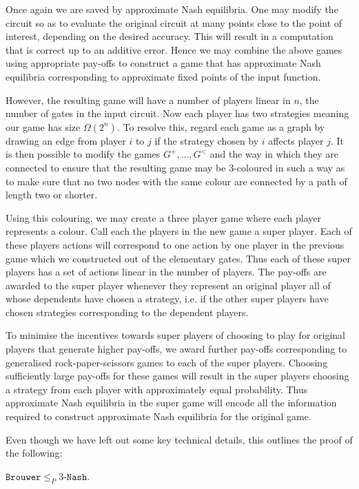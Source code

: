 \documentclass{article}
\begin{document}
Once again we are saved by approximate Nash equilibria. One may
modify the circuit so as to evaluate the original circuit at many
points close to the point of interest, depending on the desired
accuracy. This will result in a computation that is correct up to
an additive error. Hence we may combine the above games using
appropriate pay-offs to construct a game that has approximate
Nash equilibria corresponding to approximate fixed points of the
input function.

However, the resulting game will have a number of players linear in $n$,
the number of gates in the input circuit. Now each player has two strategies
meaning our game has size $\Omega(2^n)$. To resolve this, regard
each game as a graph by drawing an edge from player $i$ to $j$ if
the strategy chosen by $i$ affects player $j$. It is then possible
to modify the games $G^+,\ldots,G^<$ and the way in which they are connected
to ensure that the resulting game may be 3-coloured in such a way as
to make sure that no two nodes with the same colour are connected by a
path of length two or shorter.

Using this colouring, we may create a three player game where each
player represents a colour. Call each the players in the new game a
super player. Each of these players actions will correspond
to one action by one player in the previous game which we constructed
out of the elementary gates. Thus each of these
super players has a set of actions linear in the number of players.
The pay-offs are awarded to the super player whenever they represent
an original player all of whose dependents have chosen a strategy,
i.e. if the other super players have chosen strategies corresponding
to the dependent players.

To minimise the incentives towards super players of choosing to play
for original players that generate higher pay-offs, we award further
pay-offs corresponding to generalised rock-paper-scissors games to
each of the super players. Choosing sufficiently large pay-offs for these
games will result in the super players choosing a strategy from each
player with approximately equal probability. Thus approximate Nash
equilibria in the super game will encode all the information required
to construct approximate Nash equilibria for the original game.

Even though we have left out some key technical details, this outlines
the proof of the following:

\begin{theorem}
  $\texttt{Brouwer}\leq_P 3\texttt{-Nash}$.
\end{theorem}
\end{document}
